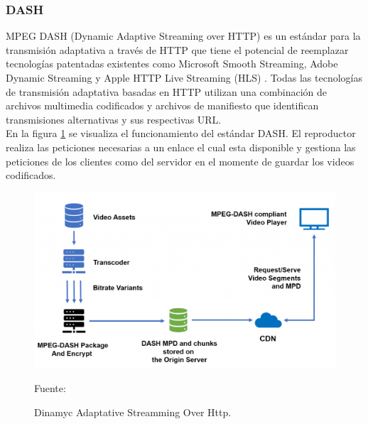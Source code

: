 \subsubsection{DASH}

MPEG DASH (Dynamic Adaptive Streaming over HTTP) es un estándar para la transmisión adaptativa a través de HTTP que tiene el potencial de reemplazar tecnologías patentadas existentes como Microsoft Smooth Streaming, Adobe Dynamic Streaming y Apple HTTP Live Streaming (HLS) \cite{dash_streamingmedia}. Todas las tecnologías de transmisión adaptativa basadas en HTTP utilizan una combinación de archivos multimedia codificados y archivos de manifiesto que identifican transmisiones alternativas y sus respectivas URL.\\


En la figura \ref{fig:dash} se visualiza el funcionamiento del estándar DASH. El reproductor realiza las peticiones necesarias a un enlace el cual esta disponible y gestiona las peticiones de los clientes como del servidor en el momente de guardar los videos codificados.\\

\begin{figure}[H]
    \begin{center}
        \includegraphics[width=11.5cm]{img/capitulo_2/dash.png}        
    \end{center}
    \begin{center}
        \caption{Dinamyc Adaptative Streamming Over Http.}
        Fuente: \cite{dash}
        \label{fig:dash}
    \end{center}
\end{figure}

